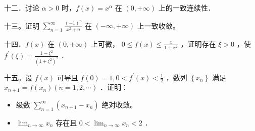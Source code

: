 \documentclass{article}
\begin{document}
十二．讨论 \(\alpha>0\) 时，\(f(x)=x^{\alpha}\) 在 \((0,+\infty)\) 上的一致连续性．

十三。证明 \(\sum_{n=1}^{\infty} \frac{(-1)^{n}}{x^{2}+n}\) 在 \((-\infty,+\infty)\) 上一致收敛。

十四．\(f(x)\) 在 \((0,+\infty)\) 上可微， \(0 \leq f(x) \leq \frac{x}{1+x^{2}}\) ，证明存在 \(\xi>0\) ，使 \(f^{\prime}(\xi)=\frac{1-\xi^{2}}{\left(1+\xi^{2}\right)^{2}}\) ．

十五。设 \(f(x)\) 可导且 \(f(0)=1,0<f^{\prime}(x)<\frac{1}{2}\) ，数列 \(\left\{x_{n}\right\}\) 满足 \(x_{n+1}=f\left(x_{n}\right)(n=1,2, \cdots)\) ．证明：

\begin{itemize}

  \item[1．] 级数 \(\sum_{n=1}^{\infty}\left(x_{n+1}-x_{n}\right)\) 绝对收敛。

  \item[2．] \(\lim _{n \rightarrow \infty} x_{n}\) 存在且 \(0<\lim _{n \rightarrow \infty} x_{n}<2\) ．
\end{itemize}
\end{document}
